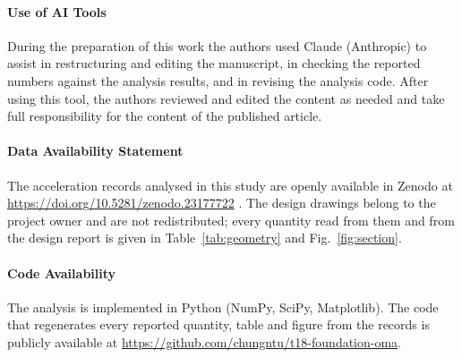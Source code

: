 \documentclass[11pt]{article}
\begin{document}
\paragraph{Use of AI Tools} During the preparation of this work the authors used Claude (Anthropic) to assist in restructuring and editing the manuscript, in checking the reported numbers against the analysis results, and in revising the analysis code. After using this tool, the authors reviewed and edited the content as needed and take full responsibility for the content of the published article.

\paragraph{Data Availability Statement} The acceleration records analysed in this study are openly available in Zenodo at \url{https://doi.org/10.5281/zenodo.23177722} \cite{t18dataset}. The design drawings belong to the project owner and are not redistributed; every quantity read from them and from the design report is given in Table~\ref{tab:geometry} and Fig.~\ref{fig:section}.

\paragraph{Code Availability} The analysis is implemented in Python (NumPy, SciPy, Matplotlib). The code that regenerates every reported quantity, table and figure from the records is publicly available at \url{https://github.com/chungntu/t18-foundation-oma}.
\end{document}
